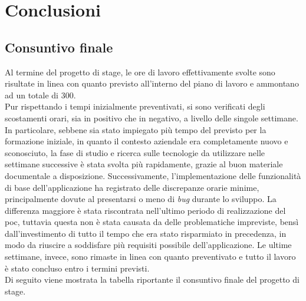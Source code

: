 
\chapter{Conclusioni}
\label{cap:conclusioni}

\section{Consuntivo finale}

Al termine del progetto di stage, le ore di lavoro effettivamente svolte sono risultate in linea con quanto previsto all'interno del piano di lavoro e ammontano ad un totale di 300.\\
Pur rispettando i tempi inizialmente preventivati, si sono verificati degli scostamenti orari, sia in positivo che in negativo, a livello delle singole settimane. In particolare, sebbene sia stato impiegato più tempo del previsto per la formazione iniziale, in quanto il contesto aziendale era completamente nuovo e sconosciuto, la fase di studio e ricerca sulle tecnologie da utilizzare nelle settimane successive è stata svolta più rapidamente, grazie al buon materiale documentale a disposizione. Successivamente, l'implementazione delle funzionalità di base dell'applicazione ha registrato delle discrepanze orarie minime, principalmente dovute al presentarsi o meno di \textit{bug} durante lo sviluppo. La differenza maggiore è stata riscontrata nell'ultimo periodo di realizzazione del \gls{poc}, tuttavia questa non è stata causata da delle problematiche impreviste, bensì dall'investimento di tutto il tempo che era stato risparmiato in precedenza, in modo da riuscire a soddisfare più requisiti possibile dell'applicazione. Le ultime settimane, invece, sono rimaste in linea con quanto preventivato e tutto il lavoro è stato concluso entro i termini previsti.\\
Di seguito viene mostrata la tabella riportante il consuntivo finale del progetto di stage.

